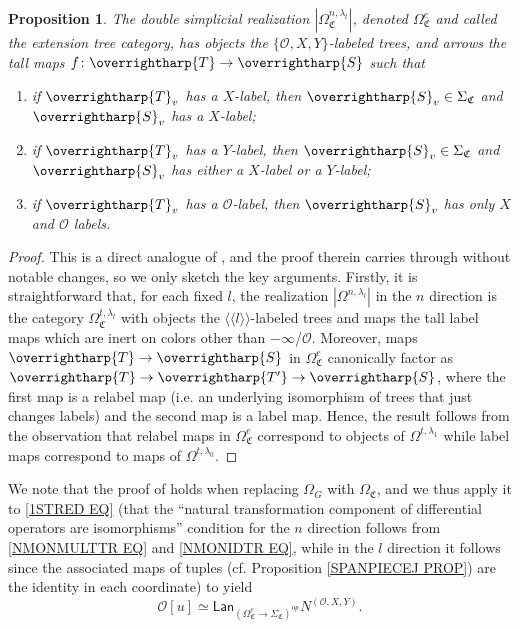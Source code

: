 \documentclass[a4paper,10pt
,draft
]{article}%
\numberwithin{equation}{section}
\numberwithin{figure}{section}
\newtheorem{proposition}[equation]{Proposition}%
\theoremstyle{definition} %
\newcommand{\vect}[1]{\text{\overrightharp{\ensuremath{#1}}}}
\renewcommand{\O}{\ensuremath{\mathcal O}}
\newcommand{\1}{\ensuremath{\mathbbm 1}}%
\newcommand{\OC}{\Omega_{\mathfrak C}}
\begin{document}
\begin{proposition}\label{EXTENTREE PROP}
	The double simplicial realization
	$|\Omega_{\mathfrak C}^{n,\lambda_l}|$,
	denoted $\OC^e$
	and called the \emph{extension tree category},
	has objects the 
	$\{\O,X,Y\}$-labeled trees,
	and arrows the tall maps $f \colon \vect{T} \to \vect{S}$ such that
	\begin{enumerate}[label=(\roman*)]
		\item if $\vect{T}_v$ has a $X$-label, 
		then $\vect{S}_v \in \Sigma_{\mathfrak{C}}$ and
		$\vect{S}_v $ has a $X$-label;
		\item if $\vect{T}_v$ has a $Y$-label, then 
		$\vect{S}_v \in \Sigma_{\mathfrak{C}}$ and
		$\vect{S}_v $ has either a $X$-label or a $Y$-label;
		\item if $\vect{T}_v$ has a $\O$-label, then 
		$\vect{S}_v $ has only $X$ and $\O$ labels.
	\end{enumerate}
\end{proposition}


\begin{proof}
	This is a direct analogue of \cite[Prop. 5.47]{BP_geo}, and the proof therein carries through without notable changes, so we only sketch the key arguments.
	Firstly, it is straightforward \cite[Rem. 5.41]{BP_geo} that, for each fixed $l$,
	the realization $|\Omega^{n,\lambda_l}|$
	in the $n$ direction is the category 
	$\Omega^{t,\lambda_l}_{\mathfrak{C}}$
	with objects the $\langle \langle l \rangle \rangle$-labeled trees and  maps the tall label maps which are inert on colors other than $-\infty$/$\O$.
	Moreover, maps 
	$\vect{T} \to \vect{S}$
	in 
	$\Omega^e_{\mathfrak{C}}$
	canonically factor as
	$\vect{T} \to \vect{T'} \to \vect{S}$,
	where the first map is a relabel map (i.e. an underlying isomorphism of trees that just changes labels) and the second map is a label map. 
	Hence, the result follows from the observation that relabel maps in 
	$\Omega^e_{\mathfrak{C}}$
	correspond to objects of  
	$\Omega^{t,\lambda_1}$
	while label maps correspond to maps of
	$\Omega^{t,\lambda_0}$.
\end{proof}



We note that the proof of \cite[Prop. 5.42]{BP_geo} %
holds when replacing $\Omega_G$ with $\Omega_{\mathfrak C}$,
and we thus 
apply it to
\eqref{1STRED EQ}
(that the ``natural transformation component of differential operators are isomorphisms'' condition for the $n$ direction follows from \eqref{NMONMULTTR EQ} and \eqref{NMONIDTR EQ},
while in the $l$ direction it follows since the associated maps of tuples (cf. Proposition \ref{SPANPIECEJ PROP}) are the identity in each coordinate)
to yield
\begin{equation}\label{2NDRED EQ}
\O[u] \simeq
\mathsf{Lan}_{\left(\Omega_{\mathfrak C}^{e} \to
	\Sigma_{\mathfrak C}\right)^{op}} N^{(\O,X,Y)}.
\end{equation}
\end{document}
